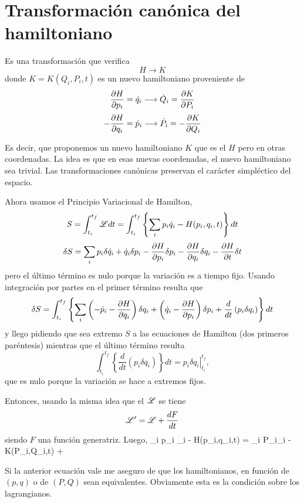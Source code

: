 \documentclass[10pt,oneside]{CBFT_book}
\begin{document}
\section{Transformación canónica del hamiltoniano}

Es una transformación que verifica
\[
	H \longrightarrow K
\]
donde $K=K(Q_i,P_i,t)$ es un nuevo hamiltoniano proveniente de
\[
	\frac{\partial^{\hspace{-0.05em}} {H}}{\partial {p_i}^{\hspace{-0.05em}}} = \dot{q}_i \longrightarrow \dot{Q}_i = \frac{\partial^{\hspace{-0.05em}} {K}}{\partial {P_i}^{\hspace{-0.05em}}}
\]
\[
	-\frac{\partial^{\hspace{-0.05em}} {H}}{\partial {q_i}^{\hspace{-0.05em}}} = \dot{p}_i \longrightarrow \dot{P}_i = -\frac{\partial^{\hspace{-0.05em}} {K}}{\partial {Q_i}^{\hspace{-0.05em}}}
\]

Es decir, que proponemos un nuevo hamiltoniano $K$ que es el $H$ pero en otras coordenadas.
La idea es que en esas nuevas coordenadas, el nuevo hamiltoniano sea trivial.
Las transformaciones canónicas preservan el carácter simpléctico del espacio.

Ahora usamos el Principio Variacional de Hamilton,
\[
	S = \int_{t_i}^{t_f} \mathscr{L} dt = \int_{t_i}^{t_f}  \left\{ \sum_i p_i \dot{q}_i - H(p_i,q_i,t) \right\} dt
\]
\[
	\delta S = \sum_i p_i \delta \dot{q}_i +  \dot{q}_i \delta p_i  - \frac{\partial^{\hspace{-0.05em}} {H}}{\partial {p_i}^{\hspace{-0.05em}}}\delta p_i 
	-\frac{\partial^{\hspace{-0.05em}} {H}}{\partial {q_i}^{\hspace{-0.05em}}}\delta q_i  - \frac{\partial^{\hspace{-0.05em}} {H}}{\partial {t}^{\hspace{-0.05em}}}\delta t
\]
pero el último término es nulo porque la variación es a tiempo fijo.
Usando integración por partes en el primer término resulta que 
\[
	\delta S = \int_{t_i}^{t_f}  \left\{ \sum_i \left(-\dot{p}_i -\frac{\partial^{\hspace{-0.05em}} {H}}{\partial {q_i}^{\hspace{-0.05em}}} \right) \delta q_i +
	\left( \dot{q}_i - \frac{\partial^{\hspace{-0.05em}} {H}}{\partial {p_i}^{\hspace{-0.05em}}} \right) \delta p_i + \frac{d}{dt}\left( p_i \delta q_i \right) \right\} dt
\]
y llego pidiendo que sea extremo $S$ a las ecuaciones de Hamilton (dos primeros paréntesis) mientras que el 
último término resulta 
\[
	\int_{t_i}^{t_f}  \left\{ \frac{d}{dt}\left( p_i \delta q_i \right) \right\} dt =
	\left. p_i \delta q_i \right|_{t_i}^{t_f},
\]
que es nulo porque la variación se hace a extremos fijos.

Entonces, usando la misma idea que el $\mathscr{L}$ se tiene 
\[
	\mathscr{L}' = \mathscr{L} + \frac{dF}{dt}
\]
siendo $F$ una función generatriz. Luego,
\be
	\sum_i p_i _i - H(p_i,q_i,t) = \sum_i P_i_i - K(P_i,Q_i,t) + 
	\label{equivalencia_hamiltonianos}
\ee

Si la anterior ecuación vale me aseguro de que los hamiltonianos, en función de $(p,q)$ o de $(P,Q)$ sean equivalentes.
Obviamente esta es la condición sobre los lagrangianos.
\end{document}
